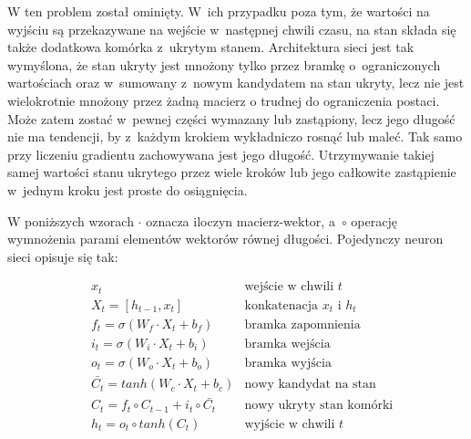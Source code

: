 W  ten problem został ominięty. W~ich przypadku poza tym, że wartości na wyjściu są przekazywane
na wejście w~następnej chwili czasu, na stan składa się także dodatkowa komórka z~ukrytym stanem.
Architektura sieci jest tak wymyślona, że stan ukryty jest mnożony tylko przez bramkę o~ograniczonych wartościach
oraz w~sumowany z~nowym kandydatem na stan ukryty, lecz nie jest wielokrotnie mnożony przez żadną macierz o
trudnej do ograniczenia postaci. Może zatem zostać w~pewnej części wymazany lub zastąpiony, lecz jego długość
nie ma tendencji, by z~każdym krokiem wykładniczo rosnąć lub maleć. Tak samo przy liczeniu gradientu
zachowywana jest jego długość. Utrzymywanie takiej samej wartości stanu ukrytego przez wiele kroków lub
jego całkowite zastąpienie w~jednym kroku jest proste do osiągnięcia.

W poniższych wzorach $\cdot$ oznacza iloczyn macierz-wektor, a~$\circ$ operację wymnożenia parami
elementów wektorów równej długości. Pojedynczy neuron sieci  opisuje się tak:

\begin{align*}
& x_t & \text{wejście w~chwili } t\\
& X_t = [h_{t-1}, x_t] & \text{konkatenacja } x_t \text{ i~} h_t\\
& f_t = \sigma(W_f \cdot X_t + b_f) & \text{bramka zapomnienia}\\
& i_t = \sigma(W_i \cdot X_t + b_i) & \text{bramka wejścia}\\
& o_t = \sigma(W_o \cdot X_t + b_o) & \text{bramka wyjścia}\\
& \bar{C_t} = tanh(W_c \cdot X_t + b_c) & \text{nowy kandydat na stan}\\
& C_t = f_t \circ C_{t-1} + i_t \circ \bar{C_t} & \text{nowy ukryty stan komórki}\\
& h_t = o_t \circ tanh(C_t) & \text{wyjście w~chwili } t
\end{align*}

